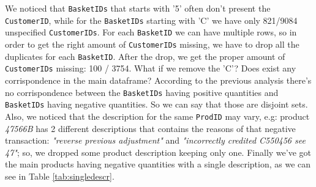 \documentclass[12pt]{article}
\begin{document}
\begin{table}[h]
\centering
{}
\caption{Negative values.}
\label{table:negative}
\end{table}

We noticed that \texttt{BasketIDs} that starts with '5' often don't present the \texttt{CustomerID}, while for the \texttt{BasketIDs} starting with 'C' we have only 821/9084 unspecified \texttt{CustomerIDs}. For each \texttt{BasketID} we can have multiple rows, so in order to get the right amount of \texttt{CustomerIDs} missing, we have to drop all the duplicates for each \texttt{BasketID}. After the drop, we get the proper amount of \texttt{CustomerIDs} missing: 100 / 3754. What if we remove the 'C'? Does exist any corrispondence in the main dataframe? According to the previous analysis there's no corrispondence between the \texttt{BasketIDs} having positive quantities and \texttt{BasketIDs} having negative quantities. So we can say that those are disjoint sets.\\
Also, we noticed that the description for the same \texttt{ProdID} may vary, e.g: product \textit{47566B} has 2 different descriptions that contains the reasons of that negative transaction: \textit{"reverse previous adjustment"} and \textit{"incorrectly credited C550456 see 47"}; so, we dropped some product description keeping only one. Finally we've got the main products having negative quantities with a single description, as we can see in Table \ref{tab:singledescr}.
\end{document}

